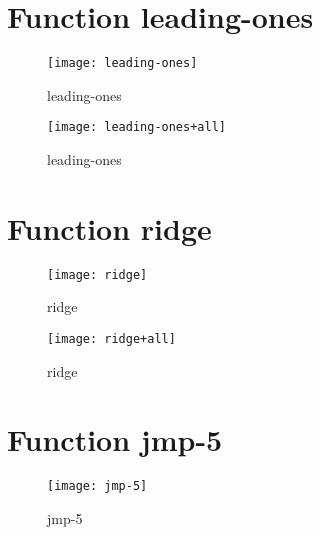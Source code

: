 \section{Function leading-ones}
\begin{center}

\end{center}

\begin{center}
\begin{figure}[h]
\centering
\texttt{[image: leading-ones]}
\caption{leading-ones}
\end{figure}
\end{center}

\begin{center}
\begin{figure}[h]
\centering
\texttt{[image: leading-ones+all]}
\caption{leading-ones}
\end{figure}
\end{center}

\newpage

\section{Function ridge}
\begin{center}

\end{center}

\begin{center}
\begin{figure}[h]
\centering
\texttt{[image: ridge]}
\caption{ridge}
\end{figure}
\end{center}

\begin{center}
\begin{figure}[h]
\centering
\texttt{[image: ridge+all]}
\caption{ridge}
\end{figure}
\end{center}

\newpage

\section{Function jmp-5}
\begin{center}

\end{center}

\begin{center}
\begin{figure}[h]
\centering
\texttt{[image: jmp-5]}
\caption{jmp-5}
\end{figure}
\end{center}

